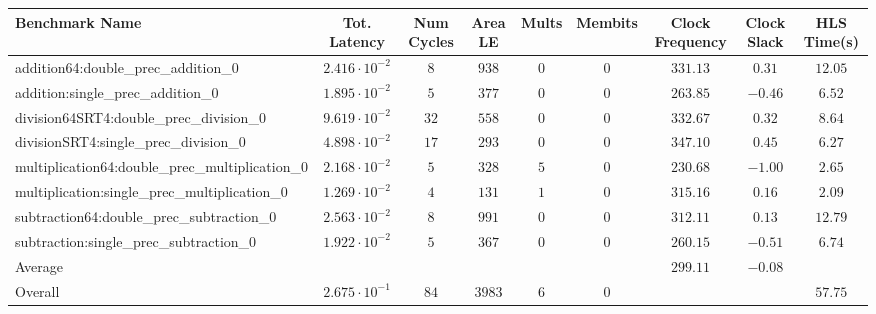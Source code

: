 \begin{tabular}{|l|c|c|c|c|c|c|c|c|}
\hline
Benchmark Name                                   & Tot. Latency            & Num Cycles & Area LE  & Mults & Membits & Clock Frequency & Clock Slack & HLS Time(s) \\
\hline
addition64:double\_prec\_addition\_0             & $ 2.416 \cdot 10^{-2} $ & $ 8      $ & $ 938  $ & $ 0 $ & $ 0   $ & $ 331.13      $ & $ 0.31    $ & $ 12.05   $ \\
addition:single\_prec\_addition\_0               & $ 1.895 \cdot 10^{-2} $ & $ 5      $ & $ 377  $ & $ 0 $ & $ 0   $ & $ 263.85      $ & $ -0.46   $ & $ 6.52    $ \\
division64SRT4:double\_prec\_division\_0         & $ 9.619 \cdot 10^{-2} $ & $ 32     $ & $ 558  $ & $ 0 $ & $ 0   $ & $ 332.67      $ & $ 0.32    $ & $ 8.64    $ \\
divisionSRT4:single\_prec\_division\_0           & $ 4.898 \cdot 10^{-2} $ & $ 17     $ & $ 293  $ & $ 0 $ & $ 0   $ & $ 347.10      $ & $ 0.45    $ & $ 6.27    $ \\
multiplication64:double\_prec\_multiplication\_0 & $ 2.168 \cdot 10^{-2} $ & $ 5      $ & $ 328  $ & $ 5 $ & $ 0   $ & $ 230.68      $ & $ -1.00   $ & $ 2.65    $ \\
multiplication:single\_prec\_multiplication\_0   & $ 1.269 \cdot 10^{-2} $ & $ 4      $ & $ 131  $ & $ 1 $ & $ 0   $ & $ 315.16      $ & $ 0.16    $ & $ 2.09    $ \\
subtraction64:double\_prec\_subtraction\_0       & $ 2.563 \cdot 10^{-2} $ & $ 8      $ & $ 991  $ & $ 0 $ & $ 0   $ & $ 312.11      $ & $ 0.13    $ & $ 12.79   $ \\
subtraction:single\_prec\_subtraction\_0         & $ 1.922 \cdot 10^{-2} $ & $ 5      $ & $ 367  $ & $ 0 $ & $ 0   $ & $ 260.15      $ & $ -0.51   $ & $ 6.74    $ \\
\hline
Average                                          & $                     $ & $        $ & $      $ & $   $ & $     $ & $ 299.11      $ & $ -0.08   $ & $         $ \\
\hline
Overall                                          & $ 2.675 \cdot 10^{-1} $ & $ 84     $ & $ 3983 $ & $ 6 $ & $ 0   $ & $             $ & $         $ & $ 57.75   $ \\
\hline
\end{tabular}
